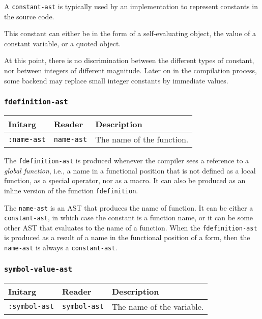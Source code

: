 A \texttt{constant-ast} is typically used by an implementation to
represent constants in the source code.

This constant can either be in the form of a self-evaluating object,
the value of a constant variable, or a quoted object.

At this point, there is no discrimination between the different types
of constant, nor between integers of different magnitude.  Later on
in the compilation process, some backend may replace small integer
constants by immediate values. 

\subsubsection{\texttt{fdefinition-ast}}
\label{fdefinition-ast}

\begin{tabular}{|l|l|l|}
\hline
Initarg & Reader & Description\\
\hline\hline
\texttt{:name-ast} & \texttt{name-ast} & The name of the function.\\  
\hline
\end{tabular}

The \texttt{fdefinition-ast} is produced whenever the compiler sees a
reference to a \emph{global function}, i.e., a name in a functional
position that is not defined as a local function, as a special
operator, nor as a macro.  It can also be produced as an inline
version of the function \texttt{fdefinition}.

The \texttt{name-ast} is an AST that produces the name of function.
It can be either a \texttt{constant-ast}, in which case the constant
is a function name, or it can be some other AST that evaluates to the
name of a function.  When the \texttt{fdefinition-ast} is produced as
a result of a name in the functional position of a form, then the
\texttt{name-ast} is always a \texttt{constant-ast}.

\subsubsection{\texttt{symbol-value-ast}}
\label{symbol-value-ast}

\begin{tabular}{|l|l|l|}
\hline
Initarg & Reader & Description\\
\hline\hline
\texttt{:symbol-ast} & \texttt{symbol-ast} & The name of the variable.\\  
\hline
\end{tabular}

